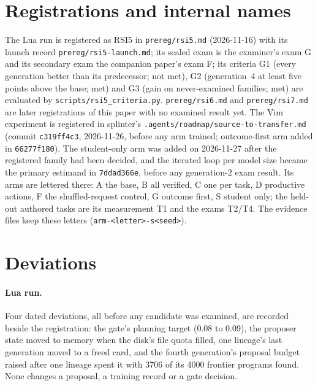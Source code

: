 \section{Registrations and internal names}\label{app:registrations}

The Lua run is registered as RSI5 in \texttt{prereg/rsi5.md} (2026-11-16) with its launch record \texttt{prereg/rsi5-launch.md};
its sealed exam is the examiner's exam G and its secondary exam the companion paper's exam F; its criteria G1 (every generation
better than its predecessor; not met), G2 (generation~4 at least five points above the base; met) and G3 (gain on never-examined
families; met) are evaluated by \texttt{scripts/rsi5\_criteria.py}. \texttt{prereg/rsi6.md} and \texttt{prereg/rsi7.md} are
later registrations of this paper with no examined result yet. The Vim experiment is registered in splinter's
\texttt{.agents/roadmap/source-to-transfer.md} (commit \texttt{c319ff4c3}, 2026-11-26, before any arm trained; outcome-first arm
added in \texttt{66277f180}). The student-only arm was added on 2026-11-27 after the registered family had been decided, and the iterated loop per
model size became the primary estimand in \texttt{7ddad366e}, before any generation-2 exam result. Its arms are lettered there: A the base, B all verified, C one per task, D productive actions, F
the shuffled-request control, G outcome first, S student only; the held-out authored tasks are its measurement T1 and the exams
T2/T4. The evidence files keep these letters (\texttt{arm-<letter>-s<seed>}).

\section{Deviations}\label{app:deviations}

\paragraph{Lua run.} Four dated deviations, all before any candidate was examined, are recorded beside the registration: the
gate's planning target (0.08 to 0.09), the proposer state moved to memory when the disk's file quota filled, one lineage's last
generation moved to a freed card, and the fourth generation's proposal budget raised after one lineage spent it with 3706 of its
4000 frontier programs found. None changes a proposal, a training record or a gate decision.

